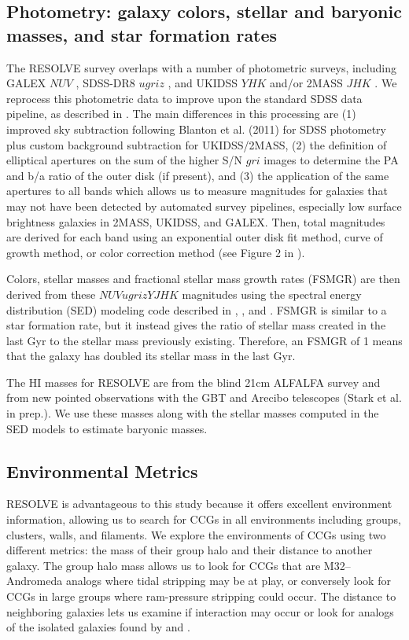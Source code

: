 \documentclass[iop,apj]{emulateapj}
\begin{document}
\subsection{Photometry: galaxy colors, stellar and baryonic masses, and star formation rates}
\label{phot}
\noindent The RESOLVE survey overlaps with a number of photometric surveys, including GALEX $NUV$ \citep{Morrissey2007}, SDSS-DR8 $ugriz$ \citep{Aihara2011}, and UKIDSS $YHK$ and/or 2MASS $JHK$ \citep{Skrutskie2006}. We reprocess this photometric data to improve upon the standard SDSS data pipeline, as described in \citet{Eckert2015}. The main differences in this processing are (1) improved sky subtraction following Blanton et al. (2011) for SDSS photometry plus custom background subtraction for UKIDSS/2MASS, (2) the definition of elliptical apertures on the sum of the higher S/N $gri$ images to determine the PA and b/a ratio of the outer disk (if present), and (3) the application of the same apertures to all bands which allows us to measure magnitudes for galaxies that may not have been detected by automated survey pipelines, especially low surface brightness galaxies in 2MASS, UKIDSS, and GALEX. Then, total magnitudes are derived for each band using an exponential outer disk fit method, curve of growth method, or color correction method (see Figure 2 in \citet{Eckert2015}). 

Colors, stellar masses and fractional stellar mass growth rates (FSMGR) are then derived from these $NUVugrizYJHK$ magnitudes using the spectral energy distribution (SED) modeling code described in \citet{Kannappan2007}, \citet{Kannappan2009}, and \citet{Kannappan2013}. FSMGR is similar to a star formation rate, but it instead gives the ratio of stellar mass created in the last Gyr to the stellar mass previously existing. Therefore, an FSMGR of 1 means that the galaxy has doubled its stellar mass in the last Gyr.

The HI masses for RESOLVE are from the blind 21cm ALFALFA survey \citep{Haynes2011} and from new pointed observations with the GBT and Arecibo telescopes (Stark et al. in prep.). We use these masses along with the stellar masses computed in the SED models to estimate baryonic masses.

\subsection{Environmental Metrics}
\label{env}
\noindent RESOLVE is advantageous to this study because it offers excellent environment information, allowing us to search for CCGs in all environments including groups, clusters, walls, and filaments. We explore the environments of CCGs using two different metrics: the mass of their group halo and their distance to another galaxy. The group halo mass allows us to look for CCGs that are M32--Andromeda analogs where tidal stripping may be at play, or conversely look for CCGs in large groups where ram-pressure stripping could occur. The distance to neighboring galaxies lets us examine if interaction may occur or look for analogs of the isolated galaxies found by \citet{Huxor2013} and \citet{Paudel2014}.
\end{document}

